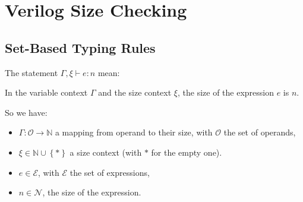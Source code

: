 \documentclass{article}
\begin{document}
\section*{Verilog Size Checking}

\subsection*{Set-Based Typing Rules}

The statement $\Gamma, \xi \vdash e: n$ mean:
\begin{center}
  In the variable context $\Gamma$ and the size context $\xi$, the size of the expression $e$ is $n$.
\end{center}

So we have:
\begin{itemize}
  \item $\Gamma: \mathcal{O} \to \mathbb{N}$ a mapping from operand to
        their size, with $\mathcal{O}$ the set of operands,
  \item $\xi \in \mathbb{N} \cup \left\{\ast\right\}$ a size context (with $\ast$ for the empty one).
  \item $e \in \mathcal{E}$, with $\mathcal{E}$ the set of expressions,
  \item $n \in \mathcal{N}$, the size of the expression.
\end{itemize}
\end{document}
